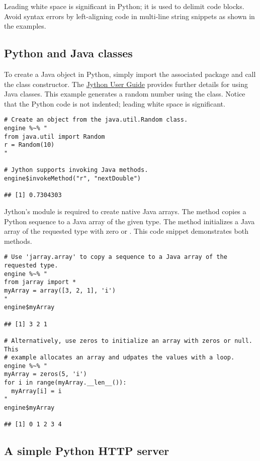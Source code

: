 Leading white space is significant in Python; it is used to delimit code blocks. Avoid syntax errors by left-aligning code in multi-line string snippets as shown in the examples.

\subsection{Python and Java classes}

To create a Java object in Python, simply import the associated package and call the class constructor. The \href{https://wiki.python.org/jython/NewUsersGuide}{Jython User Guide} provides further details for using Java classes. This example generates a random number using the  class. Notice that the Python code is not indented; leading white space is significant.

\begin{verbatim}
# Create an object from the java.util.Random class.
engine %~% "
from java.util import Random
r = Random(10)
"

# Jython supports invoking Java methods.
engine$invokeMethod("r", "nextDouble")

## [1] 0.7304303
\end{verbatim}

Jython's  module is required to create native Java arrays. The  method copies a Python sequence to a Java array of the given type. The  method initializes a Java array of the requested type with zero or . This code snippet demonstrates both methods.

\begin{verbatim}
# Use 'jarray.array' to copy a sequence to a Java array of the requested type.
engine %~% "
from jarray import *
myArray = array([3, 2, 1], 'i')
"
engine$myArray

## [1] 3 2 1

# Alternatively, use zeros to initialize an array with zeros or null. This
# example allocates an array and udpates the values with a loop.
engine %~% "
myArray = zeros(5, 'i')
for i in range(myArray.__len__()):
  myArray[i] = i
"
engine$myArray

## [1] 0 1 2 3 4
\end{verbatim}

\subsection{A simple Python HTTP server}


